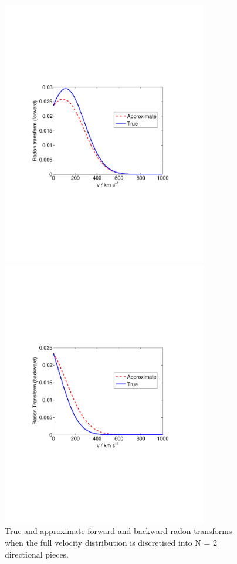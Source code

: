 \begin{figure}[t]
\label{fig:directional:radonN2}
  \centering
  \includegraphics[trim={2cm 8cm 2cm 8cm},clip,width=0.80\textwidth]{Directional/N2-forward.pdf}

  \includegraphics[trim={2cm 8cm 2cm 8cm},clip,width=0.80\textwidth]{Directional/N2-backward.pdf}

\caption[True and approximate Radon transforms for $N=2$ components]{True and approximate forward and backward radon transforms when the full velocity distribution is discretised into N = 2 directional pieces. }
\end{figure}



